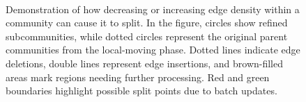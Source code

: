 \begin{figure}[hbtp]
  \centering
   \\[-1ex]
  \caption{Demonstration of how decreasing or increasing edge density within a community can cause it to split. In the figure, circles show refined subcommunities, while dotted circles represent the original parent communities from the local-moving phase. Dotted lines indicate edge deletions, double lines represent edge insertions, and brown-filled areas mark regions needing further processing. Red and green boundaries highlight possible split points due to batch updates.}
  \label{fig:community-split}
\end{figure}
